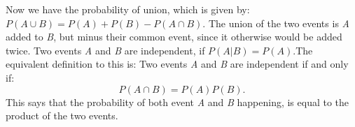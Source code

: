 \noindent Now we have the probability of union, which is given by:
\newline
$P(A \cup B)=P(A)+P(B)-P(A \cap B)$.
\newline
The union of the two events is \textit{A} added to \textit{B}, but minus their common event, since it otherwise would be added twice. 
\newline
\noindent Two events \textit{A} and \textit{B} are independent, if $P(A|B)=P(A)$.The equivalent definition to this is: Two events \textit{A} and \textit{B} are independent if and only if:
$$P(A \cap B)=P(A)P(B).$$
This says that the probability of both event \textit{A} and \textit{B} happening, is equal to the product of the two events.

